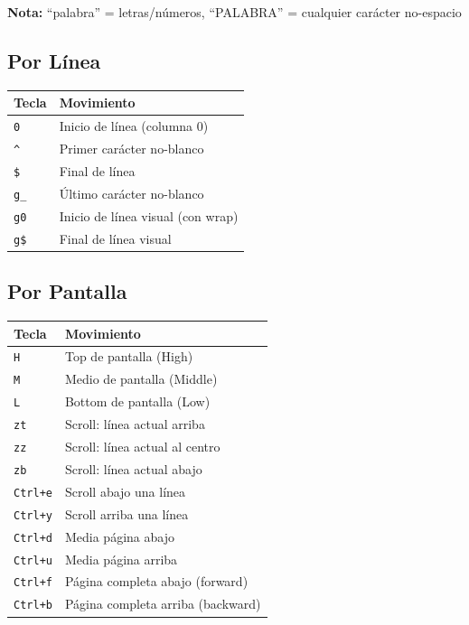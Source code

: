 \documentclass[
  doc,
  floatsintext,
  longtable,
  a4paper,
  nolmodern,
  notxfonts,
  notimes,
  12pt,
  colorlinks=true,linkcolor=blue,citecolor=blue,urlcolor=blue]{apa7}
\newcounter{none} %
\begin{document}
\textbf{Nota:} ``palabra'' = letras/números, ``PALABRA'' = cualquier
carácter no-espacio

\subsection{Por Línea}\label{por-luxednea}

{\def\LTcaptype{none} %
\begin{longtable}[]{@{}ll@{}}
\toprule\noalign{}
Tecla & Movimiento \\
\midrule\noalign{}
\endhead
\bottomrule\noalign{}
\endlastfoot
\texttt{0} & Inicio de línea (columna 0) \\
\texttt{\^{}} & Primer carácter no-blanco \\
\texttt{\$} & Final de línea \\
\texttt{g\_} & Último carácter no-blanco \\
\texttt{g0} & Inicio de línea visual (con wrap) \\
\texttt{g\$} & Final de línea visual \\
\end{longtable}
}

\subsection{Por Pantalla}\label{por-pantalla}

{\def\LTcaptype{none} %
\begin{longtable}[]{@{}ll@{}}
\toprule\noalign{}
Tecla & Movimiento \\
\midrule\noalign{}
\endhead
\bottomrule\noalign{}
\endlastfoot
\texttt{H} & Top de pantalla (High) \\
\texttt{M} & Medio de pantalla (Middle) \\
\texttt{L} & Bottom de pantalla (Low) \\
\texttt{zt} & Scroll: línea actual arriba \\
\texttt{zz} & Scroll: línea actual al centro \\
\texttt{zb} & Scroll: línea actual abajo \\
\texttt{Ctrl+e} & Scroll abajo una línea \\
\texttt{Ctrl+y} & Scroll arriba una línea \\
\texttt{Ctrl+d} & Media página abajo \\
\texttt{Ctrl+u} & Media página arriba \\
\texttt{Ctrl+f} & Página completa abajo (forward) \\
\texttt{Ctrl+b} & Página completa arriba (backward) \\
\end{longtable}
}
\end{document}
